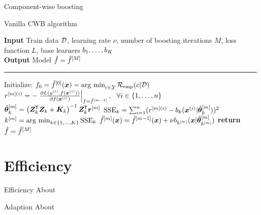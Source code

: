 \documentclass[10pt]{beamer}
\begin{document}
\begin{frame}{Component-wise boosting}

  \begin{algorithm}[H]
  \footnotesize
  \caption{Vanilla CWB algorithm}\label{algo:cwb}
  \vspace{0.15cm}
  \hspace*{\algorithmicindent} \textbf{Input} Train data $\mathcal{D}$, learning rate $\nu$, number of boosting iterations $M$, loss\\
  \hspace*{\algorithmicindent}  function $L$, base learners $b_1, \dots, b_K$\\
    \hspace*{\algorithmicindent} \textbf{Output} Model $\hat{f} = \hat{f}^{[M]}$\vspace{0.1cm}
  \hrule
  \begin{algorithmic}[1]
      \State Initialize: $f_0 = \hat{f}^{[0]}(\bm{x}) = \operatorname{arg~min}_{c\in\mathcal{Y}}\mathcal{R}_{\text{emp}}(c|\mathcal{D})$
          \State $r^{[m](i)} = -\left.\frac{\partial L(y^{(i)}, f(\bm{x}^{(i)}))}{\partial f(\bm{x}^{(i)})}\right|_{f = \hat{f}^{[m-1]}},\ \ \forall i \in \{1, \dots, n\}$%
              \State $\hat{\bm{\theta}}^{[m]}_k = \left(\bm{Z}_k^{\mkern-1.5mu\mathsf{T}} \bm{Z}_k + \bm{K}_k\right)^{-1} \bm{Z}^{\mkern-1.5mu\mathsf{T}}_k \bm{r}^{[m]}$%
              \State $\operatorname{SSE}_k = \sum_{i=1}^n(r^{[m](i)} - b_k(\bm{x}^{(i)} | \hat{\bm{\theta}}^{[m]}_k))^2$%
          \EndFor
          \State $k^{[m]} = \operatorname{arg~min}_{k\in\{1, \dots, K\}} \operatorname{SSE}_k$%
          \State $\hat{f}^{[m]}(\bm{x}) = \hat{f}^{[m-1]}(\bm{x}) + \nu b_{k^{[m]}} (\bm{x} | \hat{\bm{\theta}}^{[m]}_{k^{[m]}})$
      \EndWhile
      \State \textbf{return} $\hat{f} = \hat{f}^{[M]}$
  \EndProcedure
  \end{algorithmic}
  \end{algorithm}
\end{frame}

\section{Efficiency}

\begin{frame}{Efficiency}
  About
\end{frame}

\begin{frame}{Adaption}
  About
\end{frame}
\end{document}
